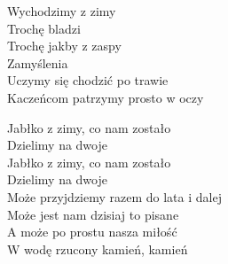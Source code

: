 \begin{text}
    Wychodzimy z zimy\\
    Trochę bladzi\\
    Trochę jakby z zaspy\\
    Zamyślenia\\
    Uczymy się chodzić po trawie\\
    Kaczeńcom patrzymy prosto w oczy

    Jabłko z zimy, co nam zostało\\
    Dzielimy na dwoje\\
    Jabłko z zimy, co nam zostało\\
    Dzielimy na dwoje\\
    Może przyjdziemy razem do lata i dalej\\
    Może jest nam dzisiaj to pisane\\
    A może po prostu nasza miłość\\
    W wodę rzucony kamień, kamień
\end{text}
\begin{chord}

\end{chord}